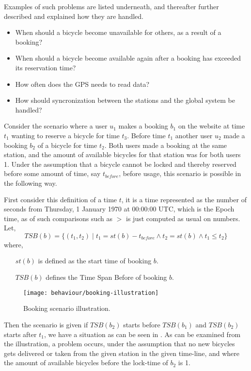 Examples of such problems are listed underneath, and thereafter further described and explained how they are handled.
\begin{itemize}
\item When should a bicycle become unavailable for others, as a result of a booking?
\item When should a bicycle become available again after a booking has exceeded its reservation time?
\item How often does the GPS needs to read data?
\item How should syncronization between the stations and the global system be handled?
\end{itemize}

\begin{description}[style=nextline]
\item[Problem 1.1] Consider the scenario where a user $u_1$ makes a booking $b_1$ on the website at time $t_1$ wanting to reserve a bicycle for time $t_3$. Before time $t_1$ another user $u_2$ made a booking $b_2$ of a bicycle for time $t_2$. Both users made a booking at the same station, and the amount of available bicycles for that station was for both users 1. Under the assumption that a bicycle cannot be locked and thereby reserved before some amount of time, say $t_{before}$, before usage, this scenario is possible in the following way.

First consider this definition of a time $t$, it is a time represented as the number of seconds from Thursday, 1 January 1970 at 00:00:00 UTC, which is the Epoch time, as of such comparisons such as $>$ is just computed as usual on numbers.
Let, 
$$TSB(b) = \{(t_1,t_2) \;| \;t_1 = st(b) - t_{before} \land t_2 = st(b) \land t_1 \leq t_2 \}$$
where,
\begin{itemize}[align = left]
	\item[$st(b)$] is defined as the start time of booking $b$.
	\item[$TSB(b)$] defines the Time Span Before of booking $b$.
\end{itemize} 

\begin{figure}[h]
	\centering
	\texttt{[image: behaviour/booking-illustration]}
	\caption{Booking scenario illustration.}\label{fig:booking-illustartion}
\end{figure}
Then the scenario is given if $TSB(b_2)$ starts before $TSB(b_1)$ and $TSB(b_2)$ starts after $t_1$, we have a situation as can be seen in .
As can be examined from the illustration, a problem occurs, under the assumption that no new bicycles gets delivered or taken from the given station in the given time-line, and where the amount of available bicycles before the lock-time of $b_2$ is 1.


\end{description}
